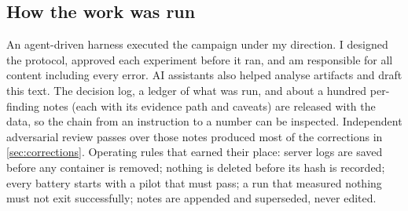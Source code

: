 \subsection{How the work was run}
An agent-driven harness executed the campaign under my direction. I designed the protocol, approved
each experiment before it ran, and am responsible for all content including every error. AI
assistants also helped analyse artifacts and draft this text. The decision log, a ledger of what was
run, and about a hundred per-finding notes (each with its evidence path and caveats) are released with
the data, so the chain from an instruction to a number can be inspected. Independent adversarial
review passes over those notes produced most of the corrections in \cref{sec:corrections}.
Operating rules that earned their place: server logs are saved before any container is removed;
nothing is deleted before its hash is recorded; every battery starts with a pilot that must pass; a
run that measured nothing must not exit successfully; notes are appended and superseded, never edited.
